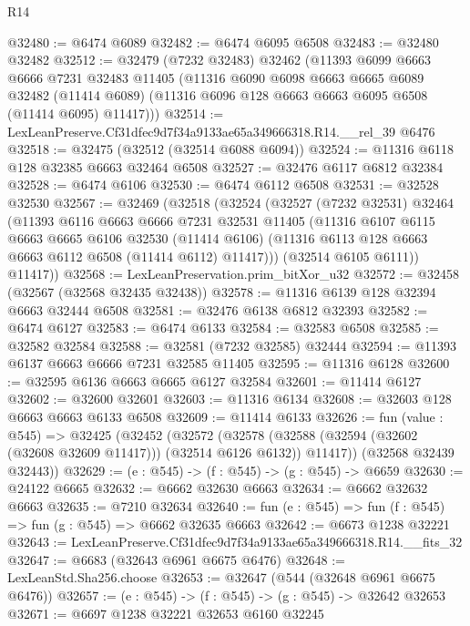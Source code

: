 \begin{lexlean}{R14}
\begin{coremodule}
@32480 := @6474 @6089
@32482 := @6474 @6095 @6508
@32483 := @32480 @32482
@32512 := @32479
    (@7232 @32483)
    @32462
    (@11393
      @6099
      @6663
      @6666
      @7231
      @32483
      @11405
      (@11316
        @6090
        @6098
        @6663
        @6665
        @6089
        @32482
        (@11414 @6089)
        (@11316 @6096 @128 @6663 @6663 @6095 @6508 (@11414 @6095) @11417)))
@32514 := LexLeanPreserve.Cf31dfec9d7f34a9133ae65a349666318.R14.__rel_39 @6476
@32518 := @32475 (@32512 (@32514 @6088 @6094))
@32524 := @11316 @6118 @128 @32385 @6663 @32464 @6508
@32527 := @32476 @6117 @6812 @32384
@32528 := @6474 @6106
@32530 := @6474 @6112 @6508
@32531 := @32528 @32530
@32567 := @32469
    (@32518
      (@32524
        (@32527
          (@7232 @32531)
          @32464
          (@11393
            @6116
            @6663
            @6666
            @7231
            @32531
            @11405
            (@11316
              @6107
              @6115
              @6663
              @6665
              @6106
              @32530
              (@11414 @6106)
              (@11316 @6113 @128 @6663 @6663 @6112 @6508 (@11414 @6112) @11417)))
          (@32514 @6105 @6111))
        @11417))
@32568 := LexLeanPreservation.prim_bitXor_u32
@32572 := @32458 (@32567 (@32568 @32435 @32438))
@32578 := @11316 @6139 @128 @32394 @6663 @32444 @6508
@32581 := @32476 @6138 @6812 @32393
@32582 := @6474 @6127
@32583 := @6474 @6133
@32584 := @32583 @6508
@32585 := @32582 @32584
@32588 := @32581 (@7232 @32585) @32444
@32594 := @11393 @6137 @6663 @6666 @7231 @32585 @11405
@32595 := @11316 @6128
@32600 := @32595 @6136 @6663 @6665 @6127 @32584
@32601 := @11414 @6127
@32602 := @32600 @32601
@32603 := @11316 @6134
@32608 := @32603 @128 @6663 @6663 @6133 @6508
@32609 := @11414 @6133
@32626 := fun (value : @545) =>
  @32425
    (@32452
      (@32572
        (@32578 (@32588 (@32594 (@32602 (@32608 @32609 @11417))) (@32514 @6126 @6132)) @11417))
      (@32568 @32439 @32443))
@32629 := (e : @545) -> (f : @545) -> (g : @545) -> @6659
@32630 := @24122 @6665
@32632 := @6662 @32630 @6663
@32634 := @6662 @32632 @6663
@32635 := @7210 @32634
@32640 := fun (e : @545) => fun (f : @545) => fun (g : @545) => @6662 @32635 @6663
@32642 := @6673 @1238 @32221
@32643 := LexLeanPreserve.Cf31dfec9d7f34a9133ae65a349666318.R14.__fits_32
@32647 := @6683 (@32643 @6961 @6675 @6476)
@32648 := LexLeanStd.Sha256.choose
@32653 := @32647 (@544 (@32648 @6961 @6675 @6476))
@32657 := (e : @545) -> (f : @545) -> (g : @545) -> @32642 @32653
@32671 := @6697
    @1238
    @32221
    @32653
    @6160
    @32245

\end{coremodule}
\end{lexlean}
